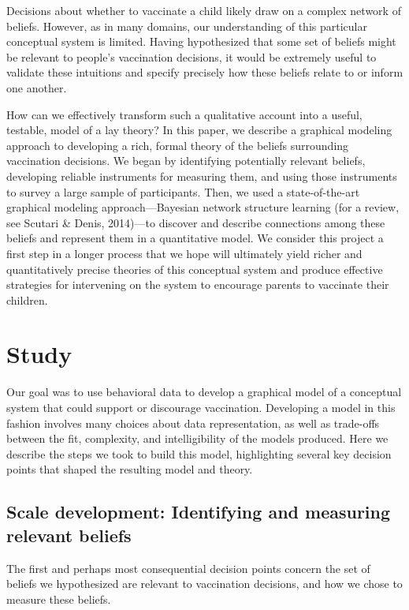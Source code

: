 \documentclass[10pt, letterpaper]{article}
\begin{document}
Decisions about whether to vaccinate a child likely draw on a complex
network of beliefs. However, as in many domains, our understanding of
this particular conceptual system is limited. Having hypothesized that
some set of beliefs might be relevant to people's vaccination decisions,
it would be extremely useful to validate these intuitions and specify
precisely how these beliefs relate to or inform one another.

How can we effectively transform such a qualitative account into a
useful, testable, model of a lay theory? In this paper, we describe a
graphical modeling approach to developing a rich, formal theory of the
beliefs surrounding vaccination decisions. We began by identifying
potentially relevant beliefs, developing reliable instruments for
measuring them, and using those instruments to survey a large sample of
participants. Then, we used a state-of-the-art graphical modeling
approach---Bayesian network structure learning (for a review, see
Scutari \& Denis, 2014)---to discover and describe connections among
these beliefs and represent them in a quantitative model. We consider
this project a first step in a longer process that we hope will
ultimately yield richer and quantitatively precise theories of this
conceptual system and produce effective strategies for intervening on
the system to encourage parents to vaccinate their children.

\section{Study}\label{study}

Our goal was to use behavioral data to develop a graphical model of a
conceptual system that could support or discourage vaccination.
Developing a model in this fashion involves many choices about data
representation, as well as trade-offs between the fit, complexity, and
intelligibility of the models produced. Here we describe the steps we
took to build this model, highlighting several key decision points that
shaped the resulting model and theory.

\subsection{Scale development: Identifying and measuring relevant
beliefs}\label{scale-development-identifying-and-measuring-relevant-beliefs}

The first and perhaps most consequential decision points concern the set
of beliefs we hypothesized are relevant to vaccination decisions, and
how we chose to measure these beliefs.
\end{document}
